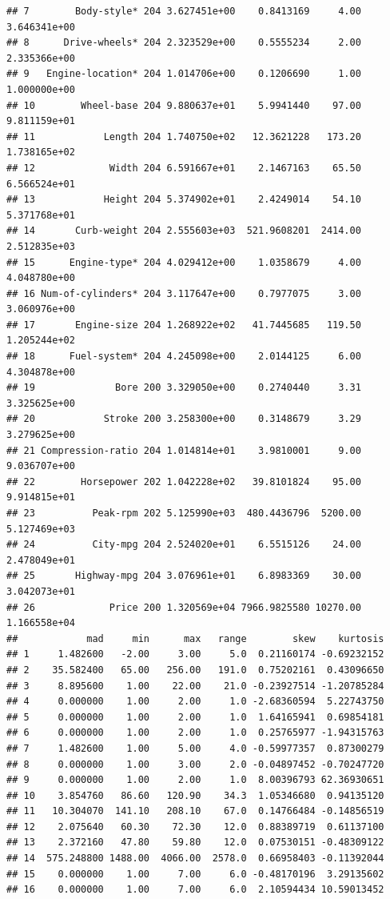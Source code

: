 \documentclass{article}\usepackage[]{graphicx}\usepackage[]{color}
\makeatletter
\newenvironment{kframe}{%
 \def\at@end@of@kframe{}%
 \ifinner\ifhmode%
  \def\at@end@of@kframe{\end{minipage}}%
  \begin{minipage}{\columnwidth}%
 \fi\fi%
 \def\FrameCommand##1{\hskip\@totalleftmargin \hskip-\fboxsep
 \colorbox{shadecolor}{##1}\hskip-\fboxsep
     \hskip-\linewidth \hskip-\@totalleftmargin \hskip\columnwidth}%
 \MakeFramed {\advance\hsize-\width
   \@totalleftmargin\z@ \linewidth\hsize
   \@setminipage}}%
 {\par\unskip\endMakeFramed%
 \at@end@of@kframe}
\newenvironment{knitrout}{}{} %
\makeatother
\begin{document}
\begin{knitrout}
\begin{kframe}
\begin{verbatim}
## 7        Body-style* 204 3.627451e+00    0.8413169     4.00 3.646341e+00
## 8      Drive-wheels* 204 2.323529e+00    0.5555234     2.00 2.335366e+00
## 9   Engine-location* 204 1.014706e+00    0.1206690     1.00 1.000000e+00
## 10        Wheel-base 204 9.880637e+01    5.9941440    97.00 9.811159e+01
## 11            Length 204 1.740750e+02   12.3621228   173.20 1.738165e+02
## 12             Width 204 6.591667e+01    2.1467163    65.50 6.566524e+01
## 13            Height 204 5.374902e+01    2.4249014    54.10 5.371768e+01
## 14       Curb-weight 204 2.555603e+03  521.9608201  2414.00 2.512835e+03
## 15      Engine-type* 204 4.029412e+00    1.0358679     4.00 4.048780e+00
## 16 Num-of-cylinders* 204 3.117647e+00    0.7977075     3.00 3.060976e+00
## 17       Engine-size 204 1.268922e+02   41.7445685   119.50 1.205244e+02
## 18      Fuel-system* 204 4.245098e+00    2.0144125     6.00 4.304878e+00
## 19              Bore 200 3.329050e+00    0.2740440     3.31 3.325625e+00
## 20            Stroke 200 3.258300e+00    0.3148679     3.29 3.279625e+00
## 21 Compression-ratio 204 1.014814e+01    3.9810001     9.00 9.036707e+00
## 22        Horsepower 202 1.042228e+02   39.8101824    95.00 9.914815e+01
## 23          Peak-rpm 202 5.125990e+03  480.4436796  5200.00 5.127469e+03
## 24          City-mpg 204 2.524020e+01    6.5515126    24.00 2.478049e+01
## 25       Highway-mpg 204 3.076961e+01    6.8983369    30.00 3.042073e+01
## 26             Price 200 1.320569e+04 7966.9825580 10270.00 1.166558e+04
##            mad     min      max   range        skew    kurtosis
## 1     1.482600   -2.00     3.00     5.0  0.21160174 -0.69232152
## 2    35.582400   65.00   256.00   191.0  0.75202161  0.43096650
## 3     8.895600    1.00    22.00    21.0 -0.23927514 -1.20785284
## 4     0.000000    1.00     2.00     1.0 -2.68360594  5.22743750
## 5     0.000000    1.00     2.00     1.0  1.64165941  0.69854181
## 6     0.000000    1.00     2.00     1.0  0.25765977 -1.94315763
## 7     1.482600    1.00     5.00     4.0 -0.59977357  0.87300279
## 8     0.000000    1.00     3.00     2.0 -0.04897452 -0.70247720
## 9     0.000000    1.00     2.00     1.0  8.00396793 62.36930651
## 10    3.854760   86.60   120.90    34.3  1.05346680  0.94135120
## 11   10.304070  141.10   208.10    67.0  0.14766484 -0.14856519
## 12    2.075640   60.30    72.30    12.0  0.88389719  0.61137100
## 13    2.372160   47.80    59.80    12.0  0.07530151 -0.48309122
## 14  575.248800 1488.00  4066.00  2578.0  0.66958403 -0.11392044
## 15    0.000000    1.00     7.00     6.0 -0.48170196  3.29135602
## 16    0.000000    1.00     7.00     6.0  2.10594434 10.59013452

\end{verbatim}
\end{kframe}
\end{knitrout}
\end{document}

